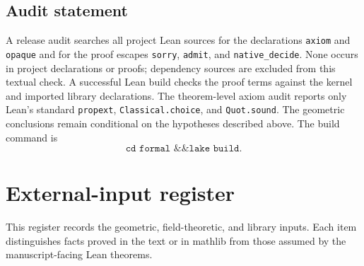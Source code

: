 \documentclass[11pt]{article}
\numberwithin{equation}{section}
\theoremstyle{definition}
\theoremstyle{remark}
\newcommand{\code}[1]{\texttt{#1}}
\begin{document}
\subsection{Audit statement}

A release audit searches all project Lean sources for the declarations
\code{axiom} and \code{opaque} and for the proof escapes \code{sorry},
\code{admit}, and \code{native\_decide}.  None occurs in project
declarations or proofs; dependency sources are excluded from this textual
check.  A successful Lean build checks the proof terms against the kernel
and imported library declarations.  The theorem-level axiom audit reports
only Lean's standard \code{propext}, \code{Classical.choice}, and
\code{Quot.sound}.  The geometric conclusions remain conditional on the
hypotheses described above.  The build command is
\[
 \code{cd formal \&\& lake build}.
\]

\section{External-input register}
\label{sec:external-register}

This register records the geometric, field-theoretic, and library inputs.
Each item distinguishes facts proved in the text or in mathlib from those
assumed by the manuscript-facing Lean theorems.
\end{document}
